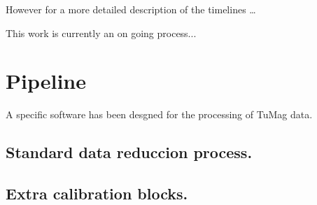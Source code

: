 However for a more detailed description of the timelines \dots

This work is currently an on going process... 
\section{Pipeline}
A specific software has been desgned for the processing of TuMag data. 

\subsection{Standard data reduccion process.}

\subsection{Extra calibration blocks.}



